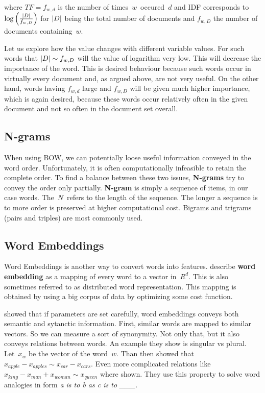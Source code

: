 where $TF = f_{w, d}$ is the number of times~$w$~occured~$d$ and IDF corresponds to $\log \left( {\left|{D}\right|\over f_{w,D}}  \right)$ for $\left|{D}\right|$ being the total number of documents and $f_{w, D}$ the number of documents containing~$w$.

Let us explore how the value changes with different variable values. For such words that $\left|{D}\right| \sim f_{w, D}$ will the value of logarithm very low. This will decrease the importance of the word. This is desired behaviour because such words occur in virtually every document and, as argued above, are not very useful. On the other hand, words having $f_{w,d}$ large and $f_{w,D}$ will be given much higher importance, which is again desired, because these words occur relatively often in the given document and not so often in the document set overall.



\subsection{N-grams}

When using BOW, we can potentially loose useful information conveyed in the word order.
Unfortunately, it is often computationally infeasible to retain the complete order.
To find a balance between these two issues, {\bf N-grams} try to convey the order only partially.
{\bf N-gram} is simply a sequence of items, in our case words. The~$N$~refers to the length of the sequence.
The longer a sequence is to more order is preserved at higher computational cost.
Bigrams and trigrams (pairs and triples) are most commonly used.

\subsection{Word Embeddings}

Word Embeddings is another way to convert words into features.
\citet{LeGo14} describe {\bf word embedding} as a mapping of every word to a vector in~$R^d$.
This is also sometimes referred to as distributed word representation.
This mapping is obtained by using a big corpus of data by optimizing some cost function.

\citet{Mik13} showed that if parameters are set carefully, word embeddings conveys both semantic and sytanctic information.
First, similar words are mapped to similar vectors. So we can measure a sort of synonymity.
Not only that, but it also conveys relations between words.
An example they show is singular vs plural. Let~$x_{w}$ be the vector of the word~$w$.
Than then showed that $x_{apple}-x_{apples} \sim x_{car}-x_{cars}$.
Even more complicated relations like $x_{king} - x_{man} + x_{woman} \sim x_{queen}$ where shown.
They use this property to solve word analogies in form {\it a is to b as c is to \_\_\_}.

